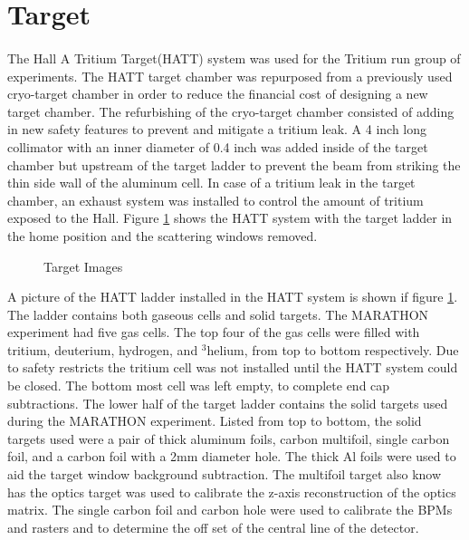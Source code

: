 \section{Target}\label{sec:target}
\paragraph{} The Hall A Tritium Target(HATT) system was used for the Tritium run group of experiments. The HATT target chamber was repurposed from a previously used cryo-target chamber in order to reduce the financial cost of designing a new target chamber. The refurbishing of the cryo-target chamber consisted of adding in new safety features to prevent and mitigate a tritium leak.  A 4 inch long collimator with an inner diameter of 0.4 inch was added inside of the target chamber but upstream of the target ladder to prevent the beam from striking the thin side wall of the aluminum cell. In case of a tritium leak in the target chamber, an exhaust system was installed to control the amount of tritium exposed to the Hall.\cite{HATT_eng}  Figure \ref{HATT} shows the HATT system with the target ladder in the home position and the scattering windows removed. 
\begin{figure}[t]
	\centering
	\caption{Target Images}
	\hspace*{-20pt}
	\centering
	\label{HATT}


\end{figure}
A picture of the HATT ladder installed in the HATT system is shown if figure \ref{HATT}. The ladder contains both gaseous cells and solid targets. The MARATHON experiment had five gas cells. The top four of the gas cells were filled with tritium, deuterium, hydrogen, and $^3$helium, from top to bottom respectively. Due to safety restricts the tritium cell was not installed until the HATT system could be closed. The bottom most cell was left empty, to complete end cap subtractions. The lower half of the target ladder contains the solid targets used during the MARATHON experiment. Listed from top to bottom, the solid targets used were a pair of thick aluminum foils, carbon multifoil, single carbon foil, and a carbon foil with a 2mm diameter hole. The thick Al foils were used to aid the target window background subtraction. The multifoil target also know has the optics target was used to calibrate the z-axis  reconstruction of the optics matrix. The single carbon foil and carbon hole were used to calibrate the BPMs and rasters and to determine the off set of the central line of the detector. 


